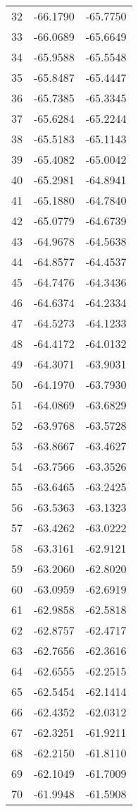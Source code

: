 \documentclass{article}
\begin{document}
\begin{longtable}{|c|c|c|}
32 & -66.1790 & -65.7750 \\
33 & -66.0689 & -65.6649 \\
34 & -65.9588 & -65.5548 \\
35 & -65.8487 & -65.4447 \\
36 & -65.7385 & -65.3345 \\
37 & -65.6284 & -65.2244 \\
38 & -65.5183 & -65.1143 \\
39 & -65.4082 & -65.0042 \\
40 & -65.2981 & -64.8941 \\
41 & -65.1880 & -64.7840 \\
42 & -65.0779 & -64.6739 \\
43 & -64.9678 & -64.5638 \\
44 & -64.8577 & -64.4537 \\
45 & -64.7476 & -64.3436 \\
46 & -64.6374 & -64.2334 \\
47 & -64.5273 & -64.1233 \\
48 & -64.4172 & -64.0132 \\
49 & -64.3071 & -63.9031 \\
50 & -64.1970 & -63.7930 \\
51 & -64.0869 & -63.6829 \\
52 & -63.9768 & -63.5728 \\
53 & -63.8667 & -63.4627 \\
54 & -63.7566 & -63.3526 \\
55 & -63.6465 & -63.2425 \\
56 & -63.5363 & -63.1323 \\
57 & -63.4262 & -63.0222 \\
58 & -63.3161 & -62.9121 \\
59 & -63.2060 & -62.8020 \\
60 & -63.0959 & -62.6919 \\
61 & -62.9858 & -62.5818 \\
62 & -62.8757 & -62.4717 \\
63 & -62.7656 & -62.3616 \\
64 & -62.6555 & -62.2515 \\
65 & -62.5454 & -62.1414 \\
66 & -62.4352 & -62.0312 \\
67 & -62.3251 & -61.9211 \\
68 & -62.2150 & -61.8110 \\
69 & -62.1049 & -61.7009 \\
70 & -61.9948 & -61.5908 \\

\end{longtable}
\end{document}
